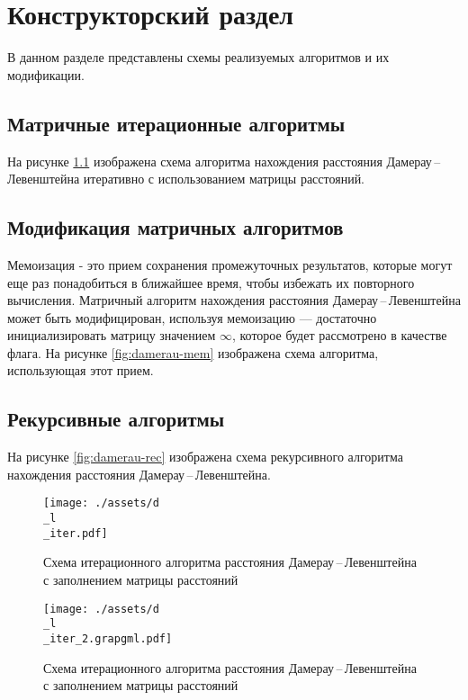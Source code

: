 \chapter{Конструкторский раздел}
В данном разделе представлены схемы реализуемых алгоритмов и их модификации.
\section{Матричные итерационные алгоритмы}
На рисунке \ref{fig:damerau-Page-1} изображена схема алгоритма нахождения расстояния Дамерау\,--\,Левенштейна итеративно  с использованием матрицы расстояний.
\section{Модификация матричных алгоритмов}
Мемоизация - это прием сохранения промежуточных результатов, которые могут еще раз понадобиться в ближайшее время, чтобы избежать их повторного вычисления. 
Матричный алгоритм нахождения расстояния Дамерау\,--\,Левенштейна может быть модифицирован, используя мемоизацию --- достаточно инициализировать матрицу значением $\infty$, которое будет рассмотрено в качестве флага.
На рисунке \ref{fig:damerau-mem} изображена схема алгоритма, использующая этот прием.
\section{Рекурсивные алгоритмы}
На рисунке \ref{fig:damerau-rec} изображена схема рекурсивного алгоритма  нахождения расстояния Дамерау\,--\,Левенштейна.
\newpage 


\begin{figure}[ht!]
	\begin{center}
		\texttt{[image: ./assets/d\\\_l\\\_iter.pdf]}
	\end{center}
	
	\caption{Схема итерационного алгоритма расстояния Дамерау\,--\,Левенштейна с заполнением матрицы расстояний}
	\label{fig:damerau-Page-1}
\end{figure}

\begin{figure}[ht!]
	\begin{center}
		\texttt{[image: ./assets/d\\\_l\\\_iter\_2.grapgml.pdf]}
	\end{center}
	
	\caption{Схема итерационного алгоритма расстояния Дамерау\,--\,Левенштейна с заполнением матрицы расстояний}
	\label{fig:damerau-Page-2}
\end{figure}

